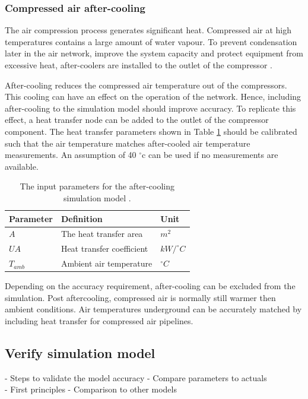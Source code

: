 		\subsubsection{Compressed air after-cooling}
		The air compression process generates significant heat. Compressed air at high temperatures contains a large amount of water vapour. To prevent condensation later in the air network, improve the system capacity and protect equipment from excessive heat, after-coolers are installed to the outlet of the compressor \cite{schroeder2009energy}.
		\par 
		After-cooling reduces the compressed air temperature out of the compressors. This cooling can have an effect on the operation of the network. Hence, including after-cooling to the simulation model should improve accuracy. 
		To replicate this effect, a heat transfer node can be added to the outlet of the compressor component. The heat transfer parameters shown in Table \ref{table: After cooling inputs} should be calibrated such that the air temperature matches after-cooled air temperature measurements. An assumption of 40 $^\circ$\gls{c} can be used if no measurements are available.
		\par
		\begin{table}
			\centering
			\begin{tabular}{lll}
				\hline 
				Parameter \hspace{1cm} & Definition \hspace{4cm} & Unit \\
				\hline
				$A$ & The heat transfer area & $m^2$ \\
				$UA$ & Heat transfer coefficient & $kW/^{\circ} C$ \\
				$T_{amb}$ & Ambient air temperature & $^{\circ} C$ \\
				\hline
			\end{tabular}
		\caption{The input parameters for the after-cooling simulation model .}
		\label{table: After cooling inputs}
		\end{table}
	Depending on the accuracy requirement, after-cooling can be excluded from the simulation. Post aftercooling, compressed air is normally still warmer then ambient conditions. Air temperatures underground can be accurately matched by including heat transfer for compressed air pipelines.
	\subsection{Verify simulation model}
		- Steps to validate  the model accuracy - Compare parameters to actuals\\
		- First principles     - Comparison to other models
		
